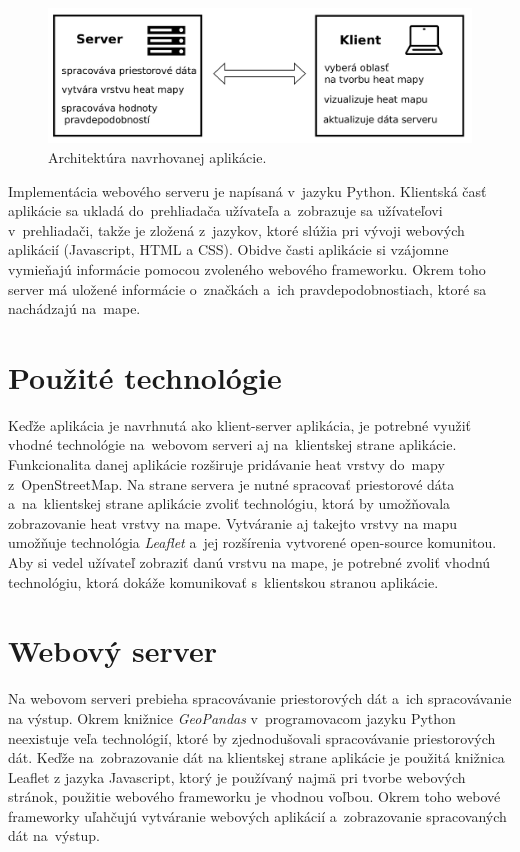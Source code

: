 \begin{figure}[ht]
    \centering
    \includegraphics[width=0.95\linewidth]{obrazky-figures/architecture.pdf}
    \caption{Architektúra navrhovanej aplikácie.}
    \label{fig:architecture}
\end{figure}

Implementácia webového serveru je napísaná v~jazyku Python. Klientská časť aplikácie sa ukladá do~prehliadača užívateľa a~zobrazuje sa užívateľovi v~prehliadači, takže je zložená z~jazykov, ktoré slúžia pri vývoji webových aplikácií (Javascript, HTML a CSS). Obidve časti aplikácie si vzájomne vymieňajú informácie pomocou zvoleného webového frameworku. Okrem toho server má uložené informácie o~značkách a~ich pravdepodobnostiach, ktoré sa nachádzajú na~mape.


\section{Použité technológie}
Keďže aplikácia je navrhnutá ako klient-server aplikácia, je potrebné využiť vhodné technológie na~webovom serveri aj na~klientskej strane aplikácie. Funkcionalita danej aplikácie rozširuje pridávanie heat vrstvy do~mapy z~OpenStreetMap. Na strane servera je nutné spracovať priestorové dáta a~na~klientskej strane aplikácie zvoliť technológiu, ktorá by umožňovala zobrazovanie heat vrstvy na mape. Vytváranie aj takejto vrstvy na mapu umožňuje technológia \emph{Leaflet} a~jej rozšírenia vytvorené open-source komunitou. Aby si vedel užívateľ zobraziť danú vrstvu na mape, je potrebné zvoliť vhodnú technológiu, ktorá dokáže komunikovať s~klientskou stranou aplikácie. 


\section{Webový server}
Na webovom serveri prebieha spracovávanie priestorových dát a~ich spracovávanie na výstup. Okrem knižnice \emph{GeoPandas} v~programovacom jazyku Python neexistuje veľa technológií, ktoré by zjednodušovali spracovávanie priestorových dát. Keďže na~zobrazovanie dát na klientskej strane aplikácie je použitá knižnica Leaflet z jazyka Javascript, ktorý je používaný najmä pri tvorbe webových stránok, použitie webového frameworku je vhodnou voľbou. Okrem toho webové frameworky uľahčujú vytváranie webových aplikácií a~zobrazovanie spracovaných dát na~výstup.

